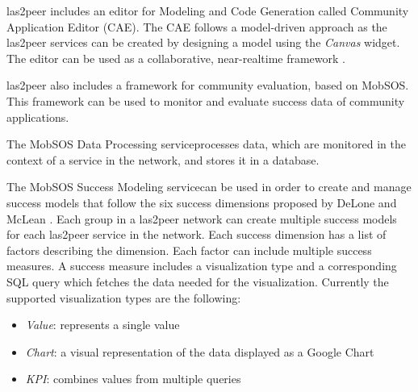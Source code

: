 
las2peer includes an editor for Modeling and Code Generation called Community Application Editor (CAE). 
The CAE follows a model-driven approach as the  las2peer services can be created by designing a model using the \emph{Canvas} widget. The editor can be used as a collaborative, near-realtime framework \cite{dND*16}. 

las2peer also includes a framework for community evaluation, based on MobSOS. This framework can be used to monitor and evaluate success data of community applications.

The MobSOS Data Processing service\footnotemark processes data, which are monitored in the context of a service in the network, and stores it in a database.


The MobSOS Success Modeling service\footnotemark can be used in order to create and manage success models that follow the six success dimensions proposed by DeLone and McLean \cite{DeMc92}.
Each group in a las2peer network can create multiple success models for each las2peer service in the network. 
Each success dimension has a list of factors describing the dimension. 
Each factor can include multiple success measures. 
A success measure includes a visualization type and a corresponding SQL query which fetches the data needed for the visualization. 
Currently the supported visualization types are the following:
\begin{itemize}
  \item \emph{Value}: represents a single value
  \item \emph{Chart}: a visual representation of the data displayed as a Google Chart \footnotemark
  \item \emph{KPI}: combines values from multiple queries 
\end{itemize}


